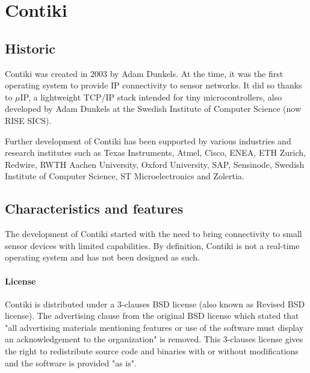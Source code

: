 \section{Contiki}

\subsection{Historic}
Contiki\cite{contiki} was created in 2003 by Adam Dunkels\cite{AdamDunkels}. %
At the time, it was the first operating system to provide IP connectivity to sensor networks.
It did so thanks to $\mu$IP\cite{uip}, a lightweight TCP/IP stack intended for tiny microcontrollers,
    also developed by Adam Dunkels at the Swedish Institute of Computer Science (now RISE SICS).%

Further development of Contiki has been supported by various industries and research institutes 
    such as Texas Instruments, Atmel, Cisco, ENEA, ETH Zurich, Redwire, RWTH Aachen University, 
    Oxford University, SAP, Sensinode, Swedish Institute of Computer Science, ST Microelectronics and Zolertia\cite{Contiki2}.

\subsection{Characteristics and features}
The development of Contiki started with the need to bring connectivity to small sensor devices with limited capabilities.
By definition, Contiki is not a real-time operating system and has not been designed as such.

\paragraph{License} Contiki is distributed under a 3-clauses BSD license (also known as Revised BSD license).
The advertising clause from the original BSD license which stated that "all advertising materials mentioning features or use of the software
must display an acknowledgement to the organization" is removed.
This 3-clauses license gives the right to redistribute source code and binaries with or without modifications
    and the software is provided "as is".

